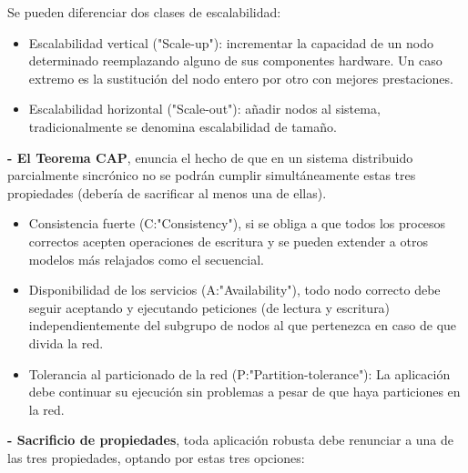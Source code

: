 \documentclass[12pt]{amsart}
\begin{document}
    Se pueden diferenciar dos clases de escalabilidad:
    
    \begin{itemize}
    \item Escalabilidad vertical ("Scale-up"): incrementar la capacidad de un nodo determinado reemplazando alguno de sus componentes hardware. Un caso extremo es la sustitución del nodo entero por otro con mejores prestaciones.
    
    \item Escalabilidad horizontal ("Scale-out"): añadir nodos al sistema, tradicionalmente se denomina escalabilidad de tamaño. 
    \end{itemize}
    
    \textbf{- El Teorema CAP}, enuncia el hecho de que en un sistema distribuido parcialmente sincrónico no se podrán cumplir simultáneamente estas tres propiedades (debería de sacrificar al menos una de ellas).
    
    \begin{itemize}
    \item Consistencia fuerte (C:"Consistency"), si se obliga a que todos los procesos correctos acepten operaciones de escritura y se pueden extender a otros modelos más relajados como el secuencial.
    
    \item Disponibilidad de los servicios (A:"Availability"), todo nodo correcto debe seguir aceptando y ejecutando peticiones (de lectura y escritura) independientemente del subgrupo de nodos al que pertenezca en caso de que divida la red.
    
    \item Tolerancia al particionado de la red (P:"Partition-tolerance"): La aplicación debe continuar su ejecución sin problemas a pesar de que haya particiones en la red.
    \end{itemize}
    
    \textbf{- Sacrificio de propiedades}, toda aplicación robusta debe renunciar a una de las tres propiedades, optando por estas tres opciones:
    
\end{document}
